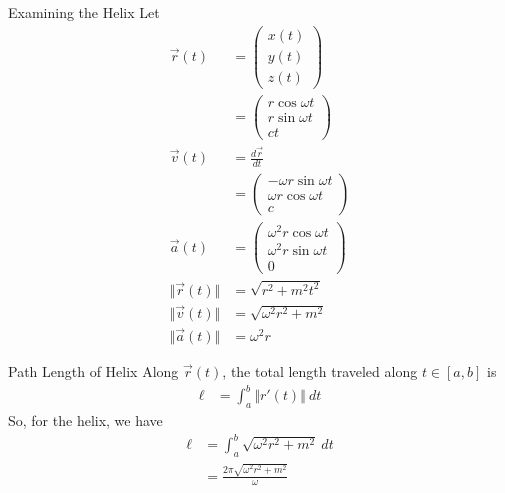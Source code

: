 \documentclass[8pt]{extarticle}
\begin{document}
  \begin{problem}{Examining the Helix}
    Let
    \begin{align*}
      \vec{r}(t) &= \begin{pmatrix}x(t) \\ y(t) \\ z(t)\end{pmatrix}\\
                 &= \begin{pmatrix}r\cos\omega t \\ r\sin\omega t \\ ct\end{pmatrix}\\
      \vec{v}(t) &= \frac{d\vec{r}}{dt}\\
                 &= \begin{pmatrix}-\omega r\sin\omega t \\ \omega r \cos\omega t \\ c\end{pmatrix}\\
      \vec{a}(t) &= \begin{pmatrix}\omega^2 r \cos\omega t \\ \omega^2 r\sin\omega t \\ 0\end{pmatrix}\\
      \Vert \vec{r}(t)\Vert &= \sqrt{r^2 + m^2t^2}\\
      \Vert \vec{v}(t)\Vert &= \sqrt{\omega^2r^2 + m^2}\\
      \Vert \vec{a}(t)\Vert &= \omega^2 r
    \end{align*}
  \end{problem}
  \begin{problem}{Path Length of Helix}
    Along $\vec{r}(t)$, the total length traveled along $t \in [a,b]$ is
    \begin{align*}
      \ell &= \int_{a}^{b}\Vert r'(t)\Vert~dt
    \end{align*}
    So, for the helix, we have
    \begin{align*}
      \ell &= \int_{a}^{b} \sqrt{\omega^2r^2 + m^2}~dt\\
           &= \frac{2\pi\sqrt{\omega^2r^2 + m^2}}{\omega}
    \end{align*}
  \end{problem}
\end{document}
